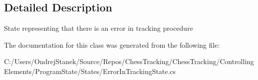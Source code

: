 \subsection{Detailed Description}
State representing that there is an error in tracking procedure 



The documentation for this class was generated from the following file\+:\begin{DoxyCompactItemize}
\item 
C\+:/\+Users/\+Ondrej\+Stanek/\+Source/\+Repos/\+Chess\+Tracking/\+Chess\+Tracking/\+Controlling\+Elements/\+Program\+State/\+States/Error\+In\+Tracking\+State.\+cs\end{DoxyCompactItemize}
